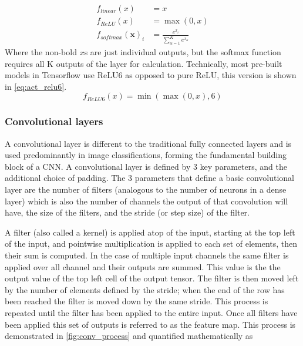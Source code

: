 \documentclass[12pt]{article}
\numberwithin{equation}{section}
\numberwithin{figure}{section}
\begin{document}
\begin{align}
	f_{linear}(x) &= x \label{eq:act_linear}\\
	f_{ReLU}(x)   &= \max(0, x) \label{eq:act_relu}\\
	f_{softmax}(\bm{x})_i &= \frac{e^{x_i}}{\sum_{\alpha=1}^{K}{e^{x_\alpha}}}\label{eq:act_softmax}
\end{align}
Where the non-bold $x$s are just individual outputs, but the softmax function requires all K outputs of the layer for calculation. Technically, most pre-built models in Tensorflow use ReLU6 as opposed to pure ReLU, this version is shown in \cref{eq:act_relu6}.
\begin{equation}
	f_{ReLU6}(x) = \min(\max(0, x), 6) \label{eq:act_relu6}
\end{equation}

\subsubsection{Convolutional layers}
A convolutional layer  is different to the traditional fully connected layers and is used predominantly in image classifications, forming the fundamental building block of a CNN. A convolutional layer is defined by 3 key parameters, and the additional choice of padding. The 3 parameters that define a basic convolutional layer are the number of filters (analogous to the number of neurons in a dense layer) which is also the number of channels the output of that convolution will have, the size of the filters, and the stride (or step size) of the filter. 

A filter (also called a kernel) is applied atop of the input, starting at the top left of the input, and pointwise multiplication is applied to each set of elements, then their sum is computed. In the case of multiple input channels the same filter is applied over all channel and their outputs are summed. This value is the the output value of the top left cell of the output tensor. The filter is then moved left by the number of elements defined by the stride; when the end of the row has been reached the filter is moved down by the same stride. This process is repeated until the filter has been applied to the entire input. Once all filters have been applied this set of outputs is referred to as the feature map. This process is demonstrated in \cref{fig:conv_process} and quantified mathematically as
\end{document}
